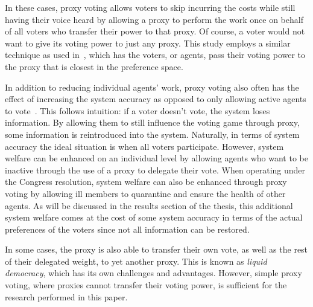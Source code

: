 In these cases, proxy voting allows voters to skip incurring the costs while
still having their voice heard by allowing a proxy to perform the work once on
behalf of all voters who transfer their power to that proxy.
Of course, a voter would not want to give its voting power to just any proxy.
This study employs a similar technique as used in~\cite{Cohensius2017}, which has the
voters, or agents, pass their voting power to the proxy that is closest in the
preference space.

In addition to reducing individual agents' work, proxy voting also often has
the effect of increasing the system accuracy as opposed to only allowing active
agents to vote~\cite{Cohensius2017}.
This follows intuition: if a voter doesn't vote, the system loses information.
By allowing them to still influence the voting game through proxy, some information
is reintroduced into the system.
Naturally, in terms of system accuracy the ideal situation is when all voters
participate.
However, system welfare can be enhanced on an individual level by allowing agents
who want to be inactive through the use of a proxy to delegate their vote.
When operating under the Congress resolution, system welfare can also be enhanced
through proxy voting by allowing ill members to quarantine and ensure the health
of other agents.
As will be discussed in the results section of the thesis,
this additional system welfare comes at
the cost of some system accuracy in terms of the actual preferences of the voters
since not all information can be restored.

In some cases, the proxy is also able to transfer their own vote, as well as the rest of
their delegated weight, to yet another proxy.
This is known as \textit{liquid democracy}, which has its own challenges and
advantages.
However, simple proxy voting, where proxies cannot transfer their voting power,
is sufficient for the research performed in this paper.


